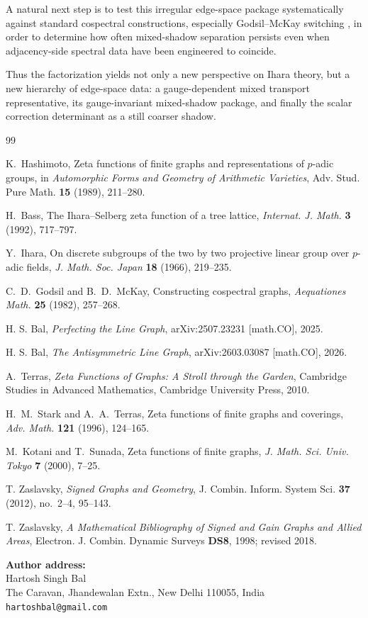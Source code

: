 \documentclass[11pt]{article}
\begin{document}
A natural next step is to test this irregular edge-space package systematically against standard cospectral constructions, especially Godsil--McKay switching \cite{GodsilMcKay1982}, in order to determine how often mixed-shadow separation persists even when adjacency-side spectral data have been engineered to coincide.

Thus the factorization yields not only a new perspective on Ihara theory, but a new hierarchy of edge-space data: a gauge-dependent mixed transport representative, its gauge-invariant mixed-shadow package, and finally the scalar correction determinant as a still coarser shadow.

\begin{thebibliography}{99}

K.~Hashimoto,
\newblock Zeta functions of finite graphs and representations of $p$-adic groups,
\newblock in \emph{Automorphic Forms and Geometry of Arithmetic Varieties}, Adv. Stud. Pure Math. \textbf{15} (1989), 211--280.

H.~Bass,
\newblock The Ihara--Selberg zeta function of a tree lattice,
\newblock \emph{Internat. J. Math.} \textbf{3} (1992), 717--797.

Y.~Ihara,
\newblock On discrete subgroups of the two by two projective linear group over $p$-adic fields,
\newblock \emph{J. Math. Soc. Japan} \textbf{18} (1966), 219--235.

C.~D.~Godsil and B.~D.~McKay,
\newblock Constructing cospectral graphs,
\newblock \emph{Aequationes Math.} \textbf{25} (1982), 257--268.

H. S. Bal,
\emph{Perfecting the Line Graph},
arXiv:2507.23231 [math.CO], 2025.

H. S. Bal,
\emph{The Antisymmetric Line Graph},
arXiv:2603.03087 [math.CO], 2026.

A.~Terras,
\newblock \emph{Zeta Functions of Graphs: A Stroll through the Garden},
\newblock Cambridge Studies in Advanced Mathematics, Cambridge University Press, 2010.

H.~M.~Stark and A.~A.~Terras,
\newblock Zeta functions of finite graphs and coverings,
\newblock \emph{Adv. Math.} \textbf{121} (1996), 124--165.

M.~Kotani and T.~Sunada,
\newblock Zeta functions of finite graphs,
\newblock \emph{J. Math. Sci. Univ. Tokyo} \textbf{7} (2000), 7--25.

T. Zaslavsky,
\emph{Signed Graphs and Geometry},
J. Combin. Inform. System Sci. \textbf{37} (2012), no.~2--4, 95--143.

T. Zaslavsky,
\emph{A Mathematical Bibliography of Signed and Gain Graphs and Allied Areas},
Electron. J. Combin. Dynamic Surveys \textbf{DS8}, 1998; revised 2018.

\end{thebibliography}

\vspace{2em}
\noindent\textbf{Author address:} \\
Hartosh Singh Bal \\
The Caravan, Jhandewalan Extn., New Delhi 110055, India \\
\texttt{hartoshbal@gmail.com}
\end{document}
